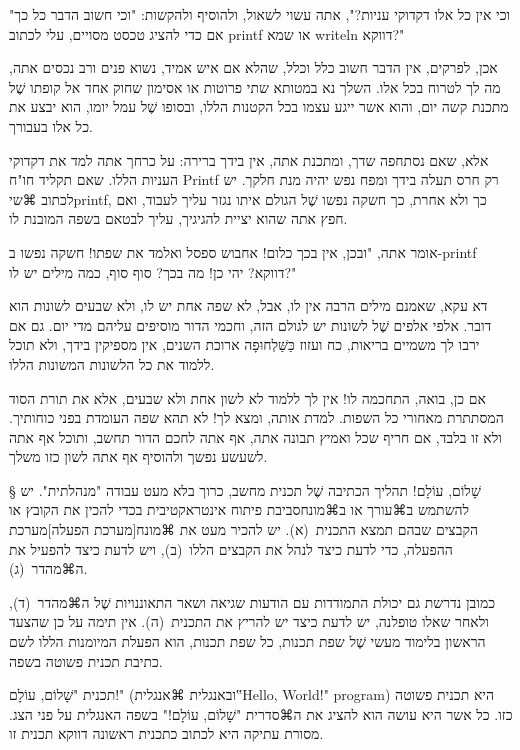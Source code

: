 "וכי אין כל אלו דקדוקי עניות?", אתה עשוי לשאול, ולהוסיף ולהקשות: "וכי חשוב הדבר
כל כך אם כדי להציג טכסט מסויים, עלי לכתוב printf או שמא writeln דווקא?"

אכן, לפרקים, אין הדבר חשוב כלל וכלל, שהלא אם איש אמיד, נשוא פנים ורב נכסים אתה,
מה לך לטרוח בכל אלו. השלך נא במטותא שתי פרוטות או אסימון שחוק אחד אל קופתו שֶׁל
מתכנת קשה יום, והוא אשר ייגע עצמו בכל הקטנות הללו, ובסופו שֶׁל עמל יומו, הוא יבצע
את כל אלו בעבורך.

אלא, שאם נסתחפה שדך, ומתכנת אתה, אין בידך ברירה: על כרחך אתה למד את דקדוקי
העניות הללו. שאם תקליד חו"ח Printf רק חרס תעלה בידך ומפח נפש יהיה מנת חלקך. יש
לכתוב ⌘שי{printf}, כך ולא אחרת, כך חשקה נפשו שֶׁל הגולם איתו נגזר עליך לעבוד, ואם
חפץ אתה שהוא יציית להגיגיך, עליך לבטאם בשפה המובנת לו.

אומר אתה, "ובכן, אין בכך כלום! אחבוש ספסל ואלמד את שפתו! חשקה נפשו ב-printf
דווקא? יהי כן! מה בכך? סוף סוף, כמה מילים יש לו?"

דא עקא, שאמנם מילים הרבה אין לו, אבל, לא שפה אחת יש לו, ולא שבעים לשונות הוא
דובר. אלפי אלפים שֶׁל לשונות יש לגולם הזה, וחכמי הדור מוסיפים עליהם מדי יום. גם
אם ירבו לך משמיים בריאות, כח ועזוז כַּשַּׁלְחוּפָה ארוכת השנים, אין מספיקין בידך, ולא
תוכל ללמוד את כל הלשונות המשונות הללו.

אם כן, בואה, התחכמה לו! אין לך ללמוד לא לשון אחת ולא שבעים,
אלא את תורת הסוד המסתתרת
מאחורי כל השפות. למדת אותה, ומצא לך! לא תהא שפה העומדת בפני כוחותיך. ולא זו
בלבד, אם חריף שכל ואמיץ תבונה אתה, אף אתה לחכם הדור תחשב, ותוכל אף אתה לשעשע
נפשך ולהוסיף אף אתה לשון כזו משלך.

\makeatother

\minitoc

§ שָׁלוֹם, עוֹלָם!
תהליך הכתיבה שֶׁל תכנית מחשב, כרוך בלא מעט עבודה "מנהלתית". יש להשתמש ב⌘עורך
או ב⌘מונח{סביבת פיתוח אינטראקטיבית} בכדי להכין את הקובץ או הקבצים שבהם תמצא
התכנית~(א). יש להכיר מעט את ⌘מונח[מערכת הפעלה]{מערכת ההפעלה}, כדי לדעת כיצד
לנהל את הקבצים הללו~(ב), ויש לדעת כיצד להפעיל את ה⌘מהדר~(ג).

כמובן נדרשת גם יכולת התמודדות עם הודעות שגיאה ושאר התאוננויות שֶׁל ה⌘מהדר~(ד),
ולאחר שאלו טופלנה, יש לדעת כיצד יש להריץ את התכנית~(ה). אין תימה על כן שהצעד
הראשון בלימוד מעשי שֶׁל שפת תכנות, כל שפת תכנות, הוא הפעלת המיומנות הללו לשם
כתיבת תכנית פשוטה בשפה.

תכנית "שָׁלוֹם, עוֹלָם!" (ובאנגלית
⌘אנגלית{‟Hello, World!" program}) היא תכנית פשוטה כזו. כל אשר
היא עושה הוא להציג את ה⌘סדרית "שָׁלוֹם, עוֹלָם!" בשפה האנגלית על פני הצג.
מסורת
עתיקה היא לכתוב כתכנית ראשונה דווקא תכנית זו.

